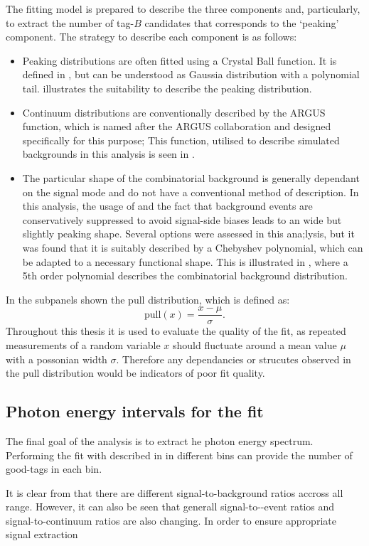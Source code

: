 The fitting model is prepared to describe the three components and, particularly, to extract the number of tag-$B$ candidates that corresponds to the `peaking' component.
The strategy to describe each component is as follows:
\begin{itemize}
    \item Peaking \Mbc distributions are often fitted using a Crystal Ball function.
    It is defined in , but can be understood as Gaussia distribution with a polynomial tail.
     illustrates the suitability to describe the peaking \Mbc distribution.
    \item Continuum \Mbc distributions are conventionally described by the ARGUS function, which is named after the ARGUS collaboration and designed specifically for this purpose;
    This function, utilised to describe \epem\ra\qqbar simulated backgrounds in this analysis is seen in .
    \item The particular shape of the combinatorial \BB background is generally dependant on the signal mode and do not have a conventional method of description.
    In this analysis, the usage of \FEI and the fact that background events are conservatively suppressed to avoid signal-side biases leads to an wide but slightly peaking shape.
    Several options were assessed in this ana;lysis, but it was found that it is suitably described by a Chebyshev polynomial, which can be adapted to a necessary functional shape.
    This is illustrated in , where a 5th order polynomial describes the combinatorial \BB background distribution.
\end{itemize}
In  the subpanels shown the pull distribution, which is defined as:
\begin{equation}\label{eq:pull_distribution}
    \mathrm{pull}(x) = \frac{x-\mu}{\sigma}. 
\end{equation}
Throughout this thesis it is used to evaluate the quality of the fit, as repeated measurements of a random variable $x$ should fluctuate around a mean value $\mu$ with a possonian width $\sigma$.
Therefore any dependancies or strucutes observed in the pull distribution would be indicators of poor fit quality. 

\subsection{Photon energy intervals for the fit}\label{eq:binning}

The final goal of the analysis is to extract he photon energy spectrum.
Performing the \Mbc fit with  described in  in different \EB bins can provide the number of good-tags in each \BB bin.

It is clear from  that there are different signal-to-background ratios accross all \EB range.
However, it can also be seen that generall signal-to-\BB-event ratios and signal-to-continuum ratios are also changing.
In order to ensure appropriate signal extraction